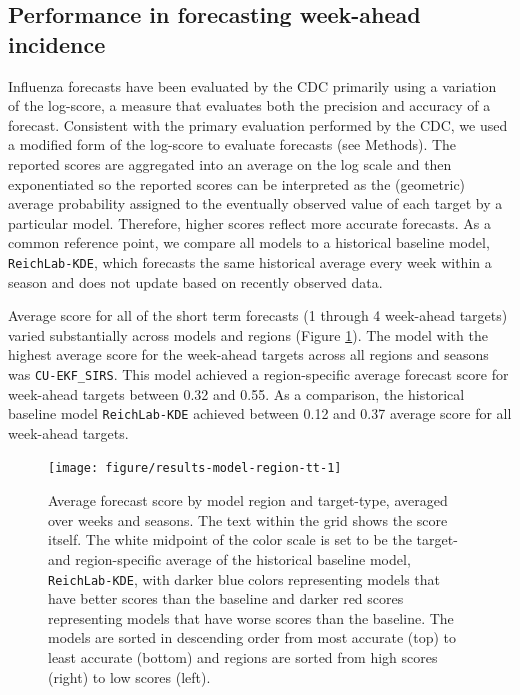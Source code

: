 \documentclass[9pt,twocolumn,twoside]{pnas-new}\usepackage[]{graphicx}\usepackage[]{color}
\newenvironment{knitrout}{}{} %
\begin{document}
\subsection*{Performance in forecasting week-ahead incidence}

Influenza forecasts have been evaluated by the CDC primarily using a variation of the log-score, a measure that evaluates both the precision and accuracy of a forecast.\cite{Gneiting2007} 
Consistent with the primary evaluation performed by the CDC, we used a modified form of the log-score to evaluate forecasts (see Methods). 
The reported scores are aggregated into an average on the log scale and then exponentiated so the reported scores can be interpreted as the (geometric) average probability assigned to the eventually observed value of each target by a particular model. 
Therefore, higher scores reflect more accurate forecasts. 
As a common reference point, we compare all models to a historical baseline model, {\tt ReichLab-KDE}, which forecasts the same historical average every week within a season and does not update based on recently observed data.



Average score for all of the short term forecasts (1 through 4 week-ahead targets) varied substantially across models and regions (Figure \ref{fig:results-model-region-tt}).
The model with the highest average score for the week-ahead targets across all regions and seasons was {\tt CU-EKF\_SIRS}.
This model achieved a region-specific average forecast score for week-ahead targets between
0.32 
and 
0.55.
As a comparison, the historical baseline model {\tt ReichLab-KDE} achieved between
0.12 and
0.37
average score for all week-ahead targets.

\begin{knitrout}
\color{fgcolor}\begin{figure}
\texttt{[image: figure/results-model-region-tt-1]} \caption[Average forecast score by model region and target-type, averaged over weeks and seasons]{Average forecast score by model region and target-type, averaged over weeks and seasons. The text within the grid shows the score itself. The white midpoint of the color scale is set to be the target- and region-specific average of the historical baseline model, {\tt ReichLab-KDE}, with darker blue colors representing models that have better scores than the baseline and darker red scores representing models that have worse scores than the baseline. The models are sorted in descending order from most accurate (top) to least accurate (bottom) and regions are sorted from high scores (right) to low scores (left).}\label{fig:results-model-region-tt}
\end{figure}


\end{knitrout}
\end{document}
